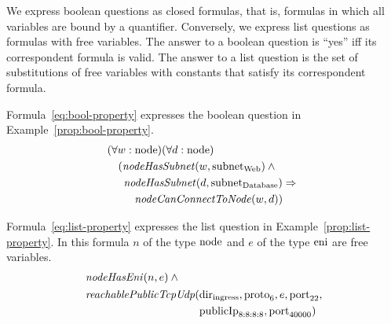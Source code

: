 We express boolean questions as closed formulas, that is, formulas in which all variables are bound by a quantifier. Conversely, we express list questions as formulas with free variables. The answer to a boolean question is ``yes'' iff its correspondent formula is valid. The answer to a list question is the set of substitutions of free variables with constants that satisfy its correspondent formula.

Formula~\ref{eq:bool-property} expresses the boolean question in Example~\ref{prop:bool-property}.
\begin{equation}\label{eq:bool-property}
\begin{aligned}
&(\forall w:\mathrm{node})(\forall d:\mathrm{node})\\
&\quad(\mathit{nodeHasSubnet}(w, \mathrm{subnet}_\text{Web})\:\wedge\:\\
&\quad\,\,\,\mathit{nodeHasSubnet}(d, \mathrm{subnet}_\text{Database}) \Rightarrow~\\
&\quad\,\,\,\quad\mathit{nodeCanConnectToNode}(w,d))
\end{aligned}
\end{equation}


Formula~\ref{eq:list-property} expresses the list question in Example~\ref{prop:list-property}. In this formula $n$ of the type $\mathrm{node}$ and $e$ of the type $\mathrm{eni}$ are free variables.
\begin{equation}\label{eq:list-property}
\begin{aligned}
&\mathit{nodeHasEni}(n,e)\:\wedge~\\
&\begin{aligned}
   \mathit{reachablePublicTcpUdp}(&\mathrm{dir}_\text{ingress}, \mathrm{proto}_6, e, \mathrm{port}_{22},\\
                                &\mathrm{publicIp}_\text{8:8:8:8}, \mathrm{port}_\text{40000})
 \end{aligned}
\end{aligned}
\end{equation}

